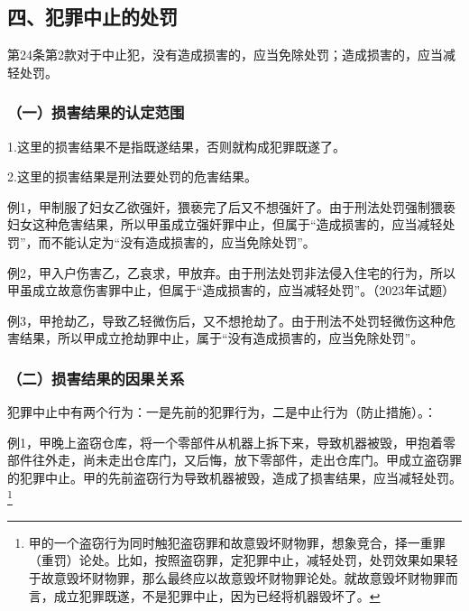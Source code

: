 

\subsection*{四、犯罪中止的处罚}

第24条第2款对于中止犯，没有造成损害的，应当免除处罚；造成损害的，应当减轻处罚。

\subsubsection*{（一）损害结果的认定范围\protect\footnotemark}

1.这里的损害结果不是指既遂结果，否则就构成犯罪既遂了。

2.这里的损害结果是刑法要处罚的危害结果。

例1，甲制服了妇女乙欲强奸，猥亵完了后又不想强奸了。由于刑法处罚强制猥亵妇女这种危害结果，所以甲虽成立强奸罪中止，但属于“造成损害的，应当减轻处罚”，而不能认定为“没有造成损害的，应当免除处罚”。

例2，甲入户伤害乙，乙哀求，甲放弃。由于刑法处罚非法侵入住宅的行为，所以甲虽成立故意伤害罪中止，但属于“造成损害的，应当减轻处罚”。（2023年试题）

例3，甲抢劫乙，导致乙轻微伤后，又不想抢劫了。由于刑法不处罚轻微伤这种危害结果，所以甲成立抢劫罪中止，属于“没有造成损害的，应当免除处罚”。

\subsubsection*{（二）损害结果的因果关系}

犯罪中止中有两个行为：一是先前的犯罪行为，二是中止行为（防止措施）。：

例1，甲晚上盗窃仓库，将一个零部件从机器上拆下来，导致机器被毁，甲抱着零部件往外走，尚未走出仓库门，又后悔，放下零部件，走出仓库门。甲成立盗窃罪的犯罪中止。甲的先前盗窃行为导致机器被毁，造成了损害结果，应当减轻处罚。\footnote{甲的一个盗窃行为同时触犯盗窃罪和故意毁坏财物罪，想象竞合，择一重罪（重罚）论处。比如，按照盗窃罪，定犯罪中止，减轻处罚，处罚效果如果轻于故意毁坏财物罪，那么最终应以故意毁坏财物罪论处。就故意毁坏财物罪而言，成立犯罪既遂，不是犯罪中止，因为已经将机器毁坏了。}

